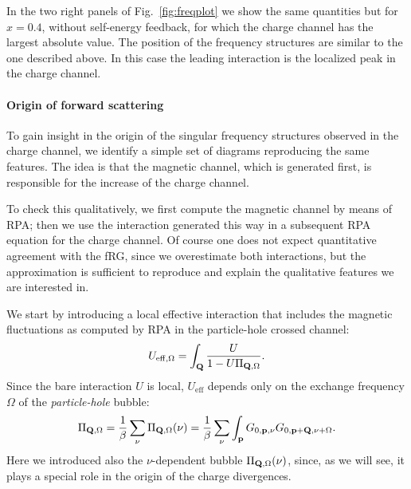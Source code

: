 In the two right panels of Fig.~\ref{fig:freqplot} we show the same quantities but for $x=0.4$, without self-energy feedback, for which the charge channel has the largest absolute value.  
The position of the frequency structures are similar to the one described above.
In this case the leading interaction is the localized peak in the charge channel.    

\paragraph*{Origin of forward scattering} 

 To gain insight in  the origin of the singular frequency structures observed in the charge channel, we identify a simple set of diagrams reproducing the same features.   
 The idea is that the magnetic channel, which is generated first, is responsible for the increase of the charge channel. 

 To check this qualitatively, we first compute the magnetic channel by means of RPA; then we use the interaction generated this way in a subsequent RPA equation for the charge channel. 
Of course one does not expect quantitative agreement with the fRG, since we overestimate both interactions, but the approximation is sufficient to reproduce and explain the qualitative features we are interested in.  
  
We start by introducing a local effective interaction that includes the magnetic fluctuations as computed by  RPA\cite{Rohringer2012} in the particle-hole crossed channel:
\begin{equation}
	U_{\mathrm{eff},\Omega} = \int_{\mathbf{Q}} \frac{U}{1- U \Pi_{\mathbf{Q},\Omega}}.
\label{pl:ueff}
\end{equation}
Since the bare interaction $U$ is local, $U_{\mathrm{eff}}$ depends only on the exchange 
frequency $\Omega$ of the \textit{particle-hole} bubble:
\begin{equation}
	\Pi_{\mathbf{Q},\Omega} = \frac{1}{\beta} \sum_{\nu} \Pi_{\mathbf{Q},\Omega}(\nu) 
	= \frac{1}{\beta} \sum_{\nu} \int_{\mathbf{p}} G_{0,\mathbf{p},\nu} G_{0,\mathbf{p}+\mathbf{Q},\nu+\Omega}.
\end{equation}
Here we introduced also the $\nu$-dependent bubble $\Pi_{\mathbf{Q},\Omega}(\nu)$, since, as we will 
see, it plays a special role in the origin of the charge divergences.

